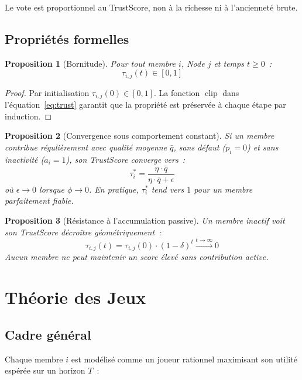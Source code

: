 \documentclass[12pt,a4paper]{article}
\theoremstyle{definition}
\theoremstyle{plain}
\newtheorem{proposition}{Proposition}[section]
\theoremstyle{remark}
\newcommand{\trustscore}{\tau}
\newcommand{\1}{\mathbf{1}}
\newcommand{\clip}{\operatorname{clip}}
\begin{document}
Le vote est proportionnel au TrustScore, non à la richesse ni à l'ancienneté brute.

\subsection{Propriétés formelles}

\begin{proposition}[Bornitude]
Pour tout membre $i$, Node $j$ et temps $t \geq 0$~:
$$\trustscore_{i,j}(t) \in [0, 1]$$
\end{proposition}

\begin{proof}
Par initialisation $\trustscore_{i,j}(0) \in [0,1]$. La fonction $\clip$ dans
l'équation~\eqref{eq:trust} garantit que la propriété est préservée à chaque
étape par induction.
\end{proof}

\begin{proposition}[Convergence sous comportement constant]
Si un membre contribue régulièrement avec qualité moyenne $\bar{q}$, sans
défaut ($p_i = 0$) et sans inactivité ($a_i = 1$), son TrustScore converge
vers~:
$$\trustscore_i^* = \frac{\eta \cdot \bar{q}}{\eta \cdot \bar{q} + \epsilon}$$
où $\epsilon \to 0$ lorsque $\phi \to 0$. En pratique, $\trustscore_i^*$ tend
vers $1$ pour un membre parfaitement fiable.
\end{proposition}

\begin{proposition}[Résistance à l'accumulation passive]
Un membre inactif voit son TrustScore décroître géométriquement~:
$$\trustscore_{i,j}(t) = \trustscore_{i,j}(0) \cdot (1-\delta)^t \xrightarrow{t \to \infty} 0$$
Aucun membre ne peut maintenir un score élevé sans contribution active.
\end{proposition}

\section{Théorie des Jeux}
\label{sec:jeux}

\subsection{Cadre général}

Chaque membre $i$ est modélisé comme un joueur rationnel maximisant son
utilité espérée sur un horizon $T$~:
\end{document}
